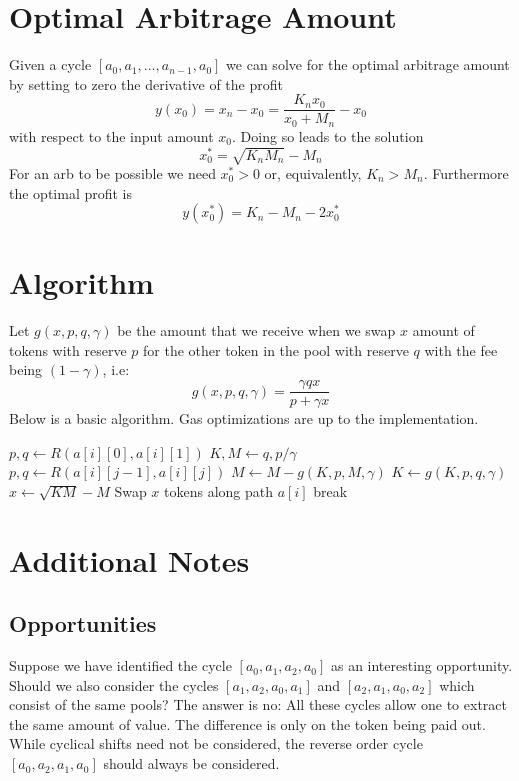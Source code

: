 \documentclass{article}
\begin{document}
\section{Optimal Arbitrage Amount}

Given a cycle $[a_0,a_1,\ldots,a_{n-1},a_0]$ we can solve for the 
optimal arbitrage amount by setting to zero the derivative of the profit
\[
y(x_0) = x_{n} - x_0 = \frac{K_{n} x_0}{x_0 + M_{n}} - x_0
\]
with respect to the input amount $x_0$. Doing so leads to the 
solution
\[
x_0^* = \sqrt{K_n M_n}-M_n
\]
For an arb to be possible we need $x_0^*>0$ or, equivalently, $K_n>M_n$. Furthermore the optimal profit is
\[
y(x_0^*) = K_n - M_n - 2 x_0^*
\]

\section{Algorithm}
Let $g(x,p,q, \gamma)$ be the amount that we receive when 
we swap $x$ amount of tokens with reserve $p$ for the other
token in the pool with reserve $q$ with the fee being $(1-\gamma)$, i.e:
\[
g(x, p, q, \gamma) = \frac{\gamma q x}{p+\gamma x}
\]
Below is a basic algorithm. Gas optimizations are up to the implementation.  
\begin{algorithmic}
    \State $p, q \gets R(a[i][0],a[i][1])$
    \State $K, M \gets q, p/\gamma$
    \State $p, q \gets R(a[i][j-1],a[i][j])$
    \State $M \gets M - g(K, p, M, \gamma)$
    \State $K \gets g(K, p, q, \gamma)$
    \EndFor
        \State $x \gets \sqrt{KM}-M$
        \State Swap $x$ tokens along path $a[i]$
        \State break
    \EndIf
\EndFor
\end{algorithmic}

\section{Additional Notes}
\subsection{Opportunities}
Suppose we have identified the cycle $[a_0,a_1,a_2,a_0]$ 
as an interesting opportunity. Should we also consider 
the cycles $[a_1,a_2,a_0,a_1]$ and $[a_2,a_1,a_0,a_2]$
which consist of the same pools? The answer is no: 
All these cycles allow one to
extract the same amount of value. 
The difference is only on the token being paid out.
While cyclical shifts need not be considered,
the reverse order cycle $[a_0,a_2,a_1,a_0]$ 
should always be considered.


%
%
\end{document}
